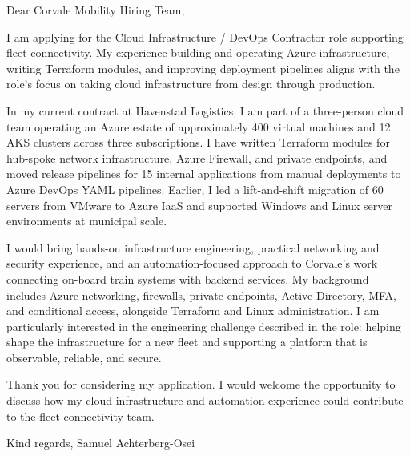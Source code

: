 \documentclass[11pt,a4paper]{article}
\begin{document}
Dear Corvale Mobility Hiring Team,

I am applying for the Cloud Infrastructure / DevOps Contractor role supporting fleet connectivity. My experience building and operating Azure infrastructure, writing Terraform modules, and improving deployment pipelines aligns with the role's focus on taking cloud infrastructure from design through production.

In my current contract at Havenstad Logistics, I am part of a three-person cloud team operating an Azure estate of approximately 400 virtual machines and 12 AKS clusters across three subscriptions. I have written Terraform modules for hub-spoke network infrastructure, Azure Firewall, and private endpoints, and moved release pipelines for 15 internal applications from manual deployments to Azure DevOps YAML pipelines. Earlier, I led a lift-and-shift migration of 60 servers from VMware to Azure IaaS and supported Windows and Linux server environments at municipal scale.

I would bring hands-on infrastructure engineering, practical networking and security experience, and an automation-focused approach to Corvale's work connecting on-board train systems with backend services. My background includes Azure networking, firewalls, private endpoints, Active Directory, MFA, and conditional access, alongside Terraform and Linux administration. I am particularly interested in the engineering challenge described in the role: helping shape the infrastructure for a new fleet and supporting a platform that is observable, reliable, and secure.

Thank you for considering my application. I would welcome the opportunity to discuss how my cloud infrastructure and automation experience could contribute to the fleet connectivity team.

Kind regards,
Samuel Achterberg-Osei
\end{document}
